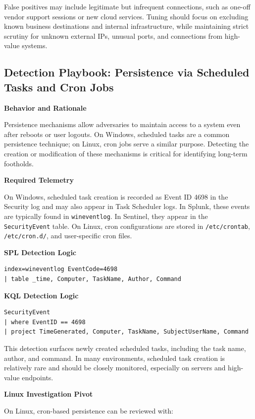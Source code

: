 False positives may include legitimate but infrequent connections, such as one-off vendor support sessions or new cloud services. 
Tuning should focus on excluding known business destinations and internal infrastructure, while maintaining strict scrutiny for 
unknown external IPs, unusual ports, and connections from high-value systems.

\subsection*{Detection Playbook: Persistence via Scheduled Tasks and Cron Jobs}

\textbf{Behavior and Rationale}

Persistence mechanisms allow adversaries to maintain access to a system even after reboots or user logouts. On Windows, 
scheduled tasks are a common persistence technique; on Linux, cron jobs serve a similar purpose. Detecting the creation or 
modification of these mechanisms is critical for identifying long-term footholds.

\textbf{Required Telemetry}

On Windows, scheduled task creation is recorded as Event ID 4698 in the Security log and may also appear in Task Scheduler logs. 
In Splunk, these events are typically found in \texttt{wineventlog}. In Sentinel, they appear in the \texttt{SecurityEvent} table. 
On Linux, cron configurations are stored in \texttt{/etc/crontab}, \texttt{/etc/cron.d/}, and user-specific cron files.

\textbf{SPL Detection Logic}
\begin{lstlisting}
index=wineventlog EventCode=4698
| table _time, Computer, TaskName, Author, Command
\end{lstlisting}

\textbf{KQL Detection Logic}
\begin{lstlisting}
SecurityEvent
| where EventID == 4698
| project TimeGenerated, Computer, TaskName, SubjectUserName, Command
\end{lstlisting}

This detection surfaces newly created scheduled tasks, including the task name, author, and command. In many environments, 
scheduled task creation is relatively rare and should be closely monitored, especially on servers and high-value endpoints.

\textbf{Linux Investigation Pivot}

On Linux, cron-based persistence can be reviewed with:

